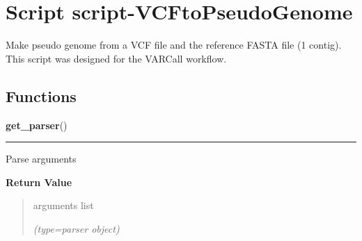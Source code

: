 %
%
%


\section{Script script-VCFtoPseudoGenome}

    \label{script-VCFtoPseudoGenome}
Make pseudo genome from a VCF file and the reference FASTA file (1 contig).
This script was designed for the VARCall workflow.



  \subsection{Functions}

    \label{script-VCFtoPseudoGenome:get_parser}

    \vspace{0.5ex}

\hspace{.8\funcindent}\begin{boxedminipage}{\funcwidth}

    \raggedright \textbf{get\_parser}()

    \vspace{-1.5ex}

    \rule{\textwidth}{0.5\fboxrule}
\setlength{\parskip}{2ex}
    Parse arguments

\setlength{\parskip}{1ex}
      \textbf{Return Value}
    \vspace{-1ex}

      \begin{quote}
      arguments list

      {\it (type=parser object)}

      \end{quote}

    \end{boxedminipage}

